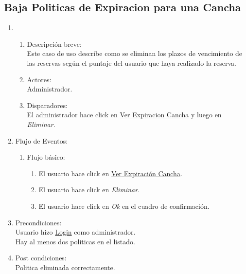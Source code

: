 \documentclass[a4paper,11pt]{article}
\begin{document}
\subsection{Baja Politicas de Expiracion para una Cancha} 
\begin{enumerate}
    \item
    \begin{enumerate}
    \item Descripci\'on breve: \\
        Este caso de uso describe como se eliminan los plazos de vencimiento de
        las reservas seg\'un el puntaje del usuario que haya realizado la reserva.
    \item Actores: \\
        Administrador.
    \item Disparadores: \\
        El administrador hace click en \underline{Ver Expiracion Cancha} y luego en \emph{Eliminar}.
    \end{enumerate}
    \item Flujo de Eventos: 
    \begin{enumerate}
        \item Flujo b\'asico:
		\begin{enumerate}
            		\item El usuario hace click en \underline{Ver Expiraci\'on Cancha}.
            		\item El usuario hace click en \emph{Eliminar}.
			\item El usuario hace click en \emph{Ok} en el cuadro de confirmaci\'on.
		\end{enumerate}
    \end{enumerate}
    \item Precondiciones: \\
        Usuario hizo \underline{Login} como administrador.\\
	Hay al menos dos politicas en el listado.
    \item Post condiciones: \\
        Politica eliminada correctamente.
\end{enumerate}


\end{document}

